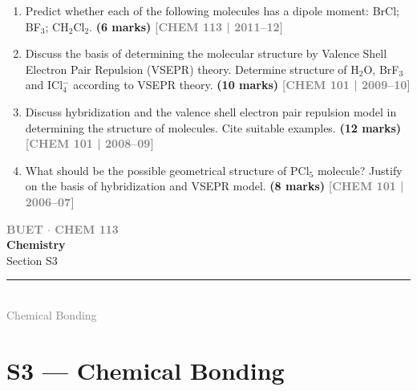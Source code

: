 \documentclass[12pt,a3paper]{article}
\newcommand{\yr}[1]{\hfill\textcolor{gray}{\small\textbf{[#1]}}}
\newcommand{\mk}[1]{\textcolor{orange!70!black}{\small\textbf{(#1 marks)}}}
\newcommand{\secdivider}[4]{%
  \newpage\thispagestyle{empty}%
  \vspace*{\fill}%
  \begin{tcolorbox}[enhanced,colback=#4!7,colframe=#3,boxrule=1.5pt,arc=8pt,
    left=20pt,right=20pt,top=22pt,bottom=22pt,
    shadow={3pt}{-3pt}{0pt}{black!15}]
    \centering
    {\large\textcolor{gray}{\textbf{BUET $\cdot$ CHEM 113}}}\\[8pt]
    {\fontsize{26}{32}\selectfont\bfseries\textcolor{#3}{Chemistry}}\\[6pt]
    {\fontsize{15}{19}\selectfont\textcolor{dgray}{#1}}\\[12pt]
    \textcolor{#3!60}{\rule{0.5\textwidth}{0.5pt}}\\[6pt]
    {\small\textcolor{gray}{#2}}
  \end{tcolorbox}%
  \vspace*{\fill}\newpage%
}
\begin{document}
\begin{enumerate}
\item Predict whether each of the following molecules has a dipole moment: BrCl; BF$_3$; CH$_2$Cl$_2$. \mk{6}
\yr{CHEM 113 | 2011--12}



\item Discuss the basis of determining the molecular structure by Valence Shell Electron Pair Repulsion (VSEPR) theory. Determine structure of H$_2$O, BrF$_3$ and ICl$_4^-$ according to VSEPR theory. \mk{10}
\yr{CHEM 101 | 2009--10}




\item Discuss hybridization and the valence shell electron pair repulsion model in determining the structure of molecules. Cite suitable examples. \mk{12}
\yr{CHEM 101 | 2008--09}




\item What should be the possible geometrical structure of PCl$_5$ molecule? Justify on the basis of hybridization and VSEPR model. \mk{8}
\yr{CHEM 101 | 2006--07}



\end{enumerate}
\newpage


\secdivider{Section S3}{Chemical Bonding}{cC}{cC}
\label{sec:S3}
\section{S3 --- Chemical Bonding}
\end{document}
